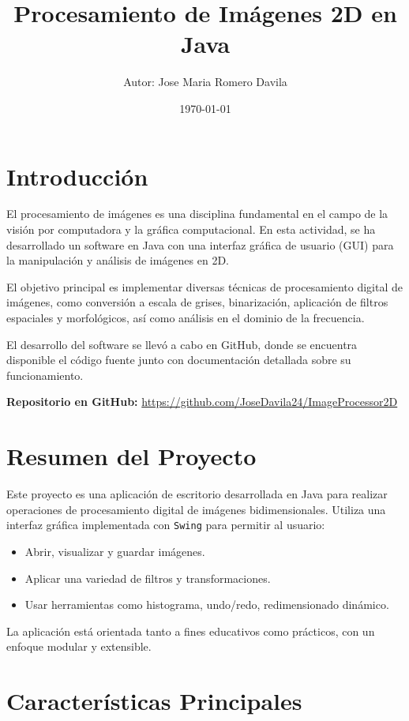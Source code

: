 \documentclass[12pt]{article}
\title{Procesamiento de Imágenes 2D en Java}
\author{Autor: Jose Maria Romero Davila}
\date{\today}
\begin{document}
\maketitle
\tableofcontents
\newpage

\section{Introducción}

El procesamiento de imágenes es una disciplina fundamental en el campo de la visión por computadora y la gráfica computacional. En esta actividad, se ha desarrollado un software en Java con una interfaz gráfica de usuario (GUI) para la manipulación y análisis de imágenes en 2D. 

El objetivo principal es implementar diversas técnicas de procesamiento digital de imágenes, como conversión a escala de grises, binarización, aplicación de filtros espaciales y morfológicos, así como análisis en el dominio de la frecuencia.

El desarrollo del software se llevó a cabo en GitHub, donde se encuentra disponible el código fuente junto con documentación detallada sobre su funcionamiento. 

\textbf{Repositorio en GitHub:} \url{https://github.com/JoseDavila24/ImageProcessor2D}

\section{Resumen del Proyecto}

Este proyecto es una aplicación de escritorio desarrollada en Java para realizar operaciones de procesamiento digital de imágenes bidimensionales. Utiliza una interfaz gráfica implementada con \texttt{Swing} para permitir al usuario:

\begin{itemize}
    \item Abrir, visualizar y guardar imágenes.
    \item Aplicar una variedad de filtros y transformaciones.
    \item Usar herramientas como histograma, undo/redo, redimensionado dinámico.
\end{itemize}

La aplicación está orientada tanto a fines educativos como prácticos, con un enfoque modular y extensible.

\section{Características Principales}
\end{document}

